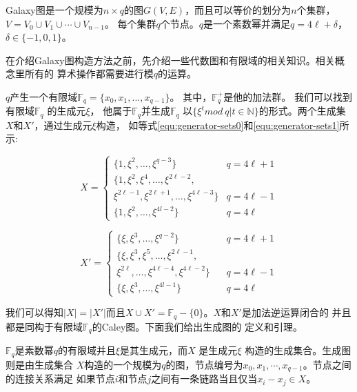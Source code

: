 Galaxy图是一个规模为$n\times q$的图$G(V,E)$，而且可以等价的划分为$n$个集群，$V= V_{0}\cup V_{1}\cup \cdots \cup V_{n-1}$。
每个集群$q$个节点。$q$是一个素数幂并满足$q=4\ell+\delta$， $\delta\in\{-1,0,1\}$。

在介绍Galaxy图构造方法之前，先介绍一些代数图和有限域的相关知识。相关概念里所有的
算术操作都需要进行模$q$的运算。

$q$产生一个有限域$\mathds{F}_q=\{x_{0},x_{1},...,x_{q-1}\}$。 其中，$\mathds{F}_q^+$是他的加法群。
我们可以找到有限域$\mathds{F}_q$
的生成元$\xi$， 他属于$\mathds{F}_q$并生成$\mathds{F}_q$
以$\{\xi^t mod\ q | t \in \mathds{N}\}$的形式。两个生成集$X$和$X'$，通过生成元$\xi$构造，
如等式\eqref{equ:generator-sets0}和\eqref{equ:generator-sets1}所示:

\begin{equation}\label{equ:generator-sets0}
  X=
  \begin{cases}
    \{1,\xi^2,\ldots,\xi^{q-3}\}& q=4 \ell+1 \\
    \{1,\xi^2,\xi^4,\ldots, \xi^{2\ell-2},\\\xi^{2\ell-1},\xi^{2\ell+1},\ldots, \xi^{4\ell-3}\} & q=4 \ell-1 \\
    \{1,\xi^2,\ldots,\xi^{4l-2}\} & q=4 \ell
  \end{cases}
\end{equation}

\begin{equation}\label{equ:generator-sets1}
  X'=
  \begin{cases}
    \{\xi,\xi^3,\ldots,\xi^{q-2}\} & q=4 \ell+1 \\
    \{\xi,\xi^3,\xi^5,\ldots,\xi^{2\ell-1}, \\\xi^{2\ell},\ldots,\xi^{4\ell-4},\xi^{4\ell-2}\}\ \ \ \  & q=4 \ell-1 \\
    \{\xi,\xi^3,\ldots,\xi^{4l-1}\} & q=4 \ell
  \end{cases}
\end{equation}

我们可以得知$|X|=|X'|$而且$X\cup X'=\mathds{F}_q-\{0\}$。$X$和$X'$是加法逆运算闭合的
并且都是同构于有限域$\mathds{F}_q$的Caley图。下面我们给出生成图的
定义和引理。


\begin{definition}
$\mathds{F}_q$是素数幂$q$的有限域并且$\xi$是其生成元，而$X$ 是生成元$\xi$ 构造的生成集合。生成图则是由生成集合
$X$构造的一个规模为$q$的图，节点编号为$x_{0}, x_{1}, \cdots, x_{q-1}$。节点之间的连接关系满足
如果节点$i$和节点$j$之间有一条链路当且仅当$x_{i} -x_{j} \in X$。
\end{definition}

